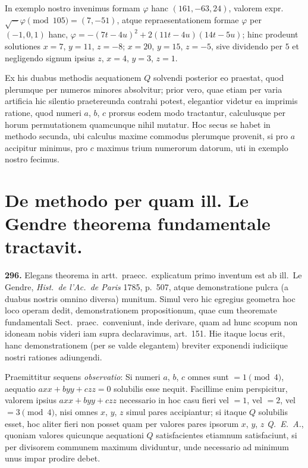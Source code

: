 \documentclass[12pt,a4paper]{article}
\theoremstyle{plain}
\theoremstyle{definition}
\theoremstyle{remark}
\begin{document}
In exemplo nostro invenimus formam $\varphi$ hanc $(161, -63, 24)$, valorem expr.~$\surd{-}\varphi\pmod{105} = (7, -51)$, atque repraesentationem formae $\varphi$ per $(-1, 0, 1)$ hanc, $\varphi = -(7t - 4u)^2 + 2(11t - 4u)(14t - 5u)$; hinc prodeunt solutiones $x = 7$, $y = 11$, $z = -8$; $x = 20$, $y = 15$, $z = -5$, sive dividendo per $5$ et negligendo signum ipsius $z$, $x = 4$, $y = 3$, $z = 1$.

Ex his duabus methodis aequationem $Q$ solvendi posterior eo praestat, quod plerumque per numeros minores absolvitur; prior vero, quae etiam per varia artificia hic silentio praetereunda contrahi potest, elegantior videtur ea imprimis ratione, quod numeri $a$, $b$, $c$ prorsus eodem modo tractantur, calculusque per horum permutationem quamcunque nihil mutatur. Hoc secus se habet in methodo secunda, ubi calculus maxime commodus plerumque provenit, si pro $a$ accipitur minimus, pro $c$ maximus trium numerorum datorum, uti in exemplo nostro fecimus.

\section*{De methodo per quam ill. Le Gendre theorema fundamentale tractavit.}

\textbf{296.} Elegans theorema in artt.~praecc.~explicatum primo inventum est ab ill.~Le Gendre, \textit{Hist.~de l'Ac.~de Paris} 1785, p.~507, atque demonstratione pulcra (a duabus nostris omnino diversa) munitum. Simul vero hic egregius geometra hoc loco operam dedit, demonstrationem propositionum, quae cum theoremate fundamentali Sect.~praec.~conveniunt, inde derivare, quam ad hunc scopum non idoneam nobis videri iam supra declaravimus, art.~151. Hie itaque locus erit, hanc demonstrationem (per se valde elegantem) breviter exponendi iudiciique nostri rationes adiungendi.

Praemittitur sequens \textit{observatio}: Si numeri $a$, $b$, $c$ omnes sunt $= 1 \pmod{4}$, aequatio $axx + byy + czz = 0$ solubilis esse nequit. Facillime enim perspicitur, valorem ipsius $axx + byy + czz$ necessario in hoc casu fieri vel $= 1$, vel $= 2$, vel $= 3 \pmod{4}$, nisi omnes $x$, $y$, $z$ simul pares accipiantur; si itaque $Q$ solubilis esset, hoc aliter fieri non posset quam per valores pares ipsorum $x$, $y$, $z$ \textit{Q.~E.~A.}, quoniam valores quicunque aequationi $Q$ satisfacientes etiamnum satisfaciunt, si per divisorem communem maximum dividuntur, unde necessario ad minimum unus impar prodire debet.
\end{document}
